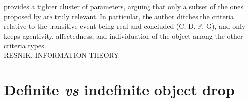 \textcite[78]{Lorenzetti2008} provides a tighter cluster of parameters, arguing that only a subset of the ones proposed by \textcite{HopperThompson1980} are truly relevant. In particular, the author ditches the criteria relative to the transitive event being real and concluded (C, D, F, G), and only keeps agentivity, affectedness, and individuation of the object among the other criteria types.\\
RESNIK, INFORMATION THEORY





\section{Definite \textit{vs} indefinite object drop} 


